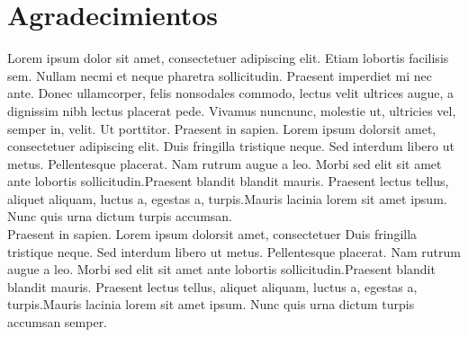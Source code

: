 \chapter{Agradecimientos}
Lorem ipsum dolor sit amet, consectetuer adipiscing elit. 
Etiam lobortis facilisis sem. Nullam necmi  et  neque  
pharetra  sollicitudin.  Praesent  imperdiet  mi  nec  
ante.  Donec  ullamcorper,  felis  nonsodales commodo, 
lectus velit ultrices augue, a dignissim nibh lectus 
placerat pede. Vivamus nuncnunc, molestie ut, ultricies 
vel, semper in, velit. Ut porttitor. Praesent in sapien.
Lorem ipsum dolorsit amet, consectetuer adipiscing elit. 
Duis fringilla tristique neque. Sed interdum libero ut metus.
Pellentesque placerat. Nam rutrum augue a leo. Morbi sed 
elit sit amet ante lobortis sollicitudin.Praesent blandit 
blandit mauris. Praesent lectus tellus, aliquet aliquam,
luctus a, egestas a, turpis.Mauris lacinia lorem sit amet
ipsum. Nunc quis urna dictum turpis accumsan.\\

Praesent in sapien. Lorem ipsum dolorsit amet, consectetuer 
Duis fringilla tristique neque. Sed interdum libero ut metus.
Pellentesque placerat. Nam rutrum augue a leo. Morbi sed 
elit sit amet ante lobortis sollicitudin.Praesent blandit 
blandit mauris. Praesent lectus tellus, aliquet aliquam,
luctus a, egestas a, turpis.Mauris lacinia lorem sit amet
ipsum. Nunc quis urna dictum turpis accumsan semper.